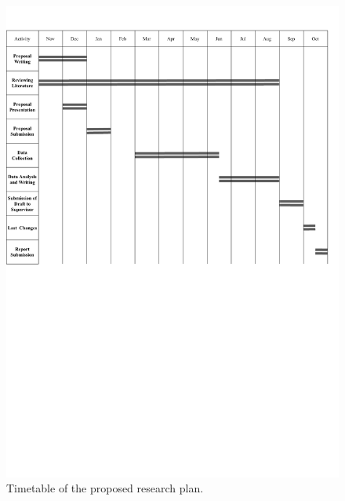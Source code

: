 \documentclass[12pt]{article}
\begin{document}
\begin{figure}[h]
\includegraphics[width=\textwidth,keepaspectratio]{Timetable.pdf}
\caption{Timetable of the proposed research plan.}
\end{figure}
\end{document}
